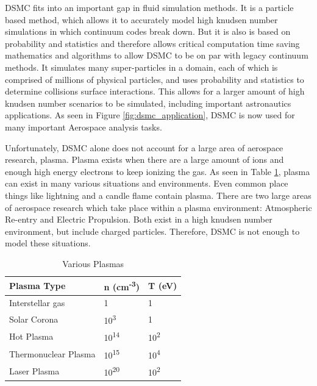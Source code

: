 \indent DSMC fits into an important gap in fluid simulation methods. It is a particle based method, which allows it to accurately model high knudsen number simulations in which continuum codes break down. But it is also is based on probability and statistics and therefore allows critical computation time saving mathematics and algorithms to allow DSMC to be on par with legacy continuum methods. It simulates many super-particles in a domain, each of which is comprised of millions of physical particles, and uses probability and statistics to determine collisions surface interactions. This allows for a larger amount of high knudsen number scenarios to be simulated, including important astronautics applications. As seen in Figure \ref{fig:dsmc_application}, DSMC is now used for many important Aerospace analysis tasks. \par


\indent Unfortunately, DSMC alone does not account for a large area of aerospace research, plasma. Plasma exists when there are a large amount of ions and enough high energy electrons to keep ionizing the gas. As seen in Table \ref{tab:plasma}, plasma can exist in many various situations and environments. Even common place things like lightning and a candle flame contain plasma. There are two large areas of aerospace research which take place within a plasma environment: Atmospheric Re-entry and Electric Propulsion. Both exist in a high knudsen number environment, but include charged particles. Therefore, DSMC is not enough to model these situations. \par


\begin{table}
\label{tab:plasma}
\caption{Various Plasmas\cite{plasma_table}}
\vspace{0.3cm}
\begin{center}
\begin{tabular}{|lll|}
\hline
Plasma Type          & n (cm\textsuperscript{-3}) & T (eV)                  \\ \hline
Interstellar gas     & 1                        & 1                     \\
Solar Corona         & 10\textsuperscript{3}    & 1                     \\
Hot Plasma           & 10\textsuperscript{14}   & 10\textsuperscript{2} \\
Thermonuclear Plasma & 10\textsuperscript{15}   & 10\textsuperscript{4} \\
Laser Plasma         & 10\textsuperscript{20}   & 10\textsuperscript{2} \\ \hline
\end{tabular}
\end{center}
\end{table}

